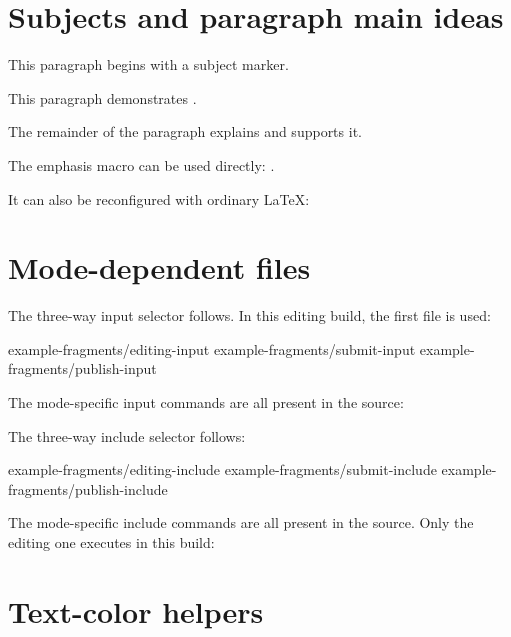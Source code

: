 \documentclass[11pt]{article}
\begin{document}
\section{Subjects and paragraph main ideas}

This paragraph begins with a subject marker.

This paragraph demonstrates \texttt{\string\cwassunto}.

The remainder of the paragraph explains and supports it.

The emphasis macro can be used directly:
.

It can also be reconfigured with ordinary LaTeX:
\renewcommand{\cwmainemphasis}[1]{\textbf{#1}}

\section{Mode-dependent files}

The three-way input selector follows. In this editing build, the first file is used:

\cwinput
  {example-fragments/editing-input}
  {example-fragments/submit-input}
  {example-fragments/publish-input}

The mode-specific input commands are all present in the source:


The three-way include selector follows:

\cwinclude
  {example-fragments/editing-include}
  {example-fragments/submit-include}
  {example-fragments/publish-include}

The mode-specific include commands are all present in the source. Only the
editing one executes in this build:


\section{Text-color helpers}
\end{document}
